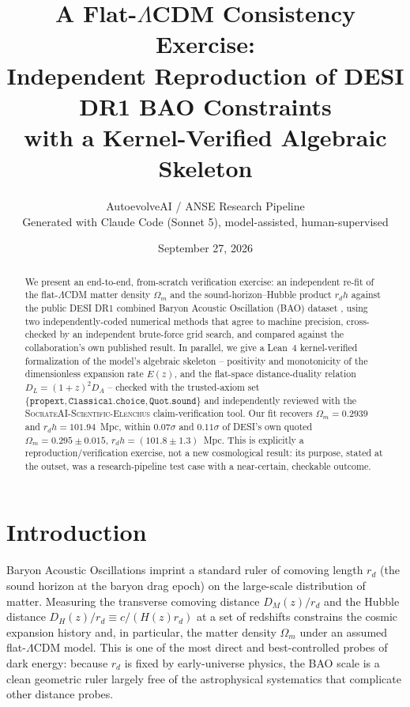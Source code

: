 \documentclass[11pt]{article}
\title{A Flat-$\Lambda$CDM Consistency Exercise:\\
Independent Reproduction of DESI DR1 BAO Constraints\\
with a Kernel-Verified Algebraic Skeleton}
\author{AutoevolveAI / ANSE Research Pipeline \\
\small Generated with Claude Code (Sonnet 5), model-assisted, human-supervised}
\date{September 27, 2026}
\begin{document}
\maketitle

\begin{abstract}
We present an end-to-end, from-scratch verification exercise: an independent
re-fit of the flat-$\Lambda$CDM matter density $\Omega_m$ and the
sound-horizon–Hubble product $r_d h$ against the public DESI DR1 combined
Baryon Acoustic Oscillation (BAO) dataset \cite{desi2024vi}, using two
independently-coded numerical methods that agree to machine precision, cross-
checked by an independent brute-force grid search, and compared against the
collaboration's own published result. In parallel, we give a Lean~4
kernel-verified formalization of the model's algebraic skeleton --
positivity and monotonicity of the dimensionless expansion rate $E(z)$, and
the flat-space distance-duality relation $D_L=(1+z)^2 D_A$ -- checked with
the trusted-axiom set $\{\texttt{propext}, \texttt{Classical.choice},
\texttt{Quot.sound}\}$ and independently reviewed with the
\textsc{SocrateAI-Scientific-Elenchus} claim-verification tool. Our fit
recovers $\Omega_m = 0.2939$ and $r_d h = 101.94$~Mpc, within $0.07\sigma$
and $0.11\sigma$ of DESI's own quoted $\Omega_m=0.295\pm0.015$,
$r_d h = (101.8\pm1.3)$~Mpc. This is explicitly a reproduction/verification
exercise, not a new cosmological result: its purpose, stated at the outset,
was a research-pipeline test case with a near-certain, checkable outcome.
\end{abstract}

\section{Introduction}

Baryon Acoustic Oscillations imprint a standard ruler of comoving length
$r_d$ (the sound horizon at the baryon drag epoch) on the large-scale
distribution of matter. Measuring the transverse comoving distance
$D_M(z)/r_d$ and the Hubble distance $D_H(z)/r_d \equiv c/(H(z)r_d)$ at a set
of redshifts constrains the cosmic expansion history and, in particular,
the matter density $\Omega_m$ under an assumed flat-$\Lambda$CDM model. This
is one of the most direct and best-controlled probes of dark energy: because
$r_d$ is fixed by early-universe physics, the BAO scale is a clean geometric
ruler largely free of the astrophysical systematics that complicate other
distance probes.
\end{document}

